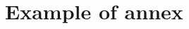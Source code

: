 \documentclass[../main.tex]{subfiles}
\begin{document}
	
	\section{Example of annex}
	\label{sec:annex2}
	
	
\end{document}
